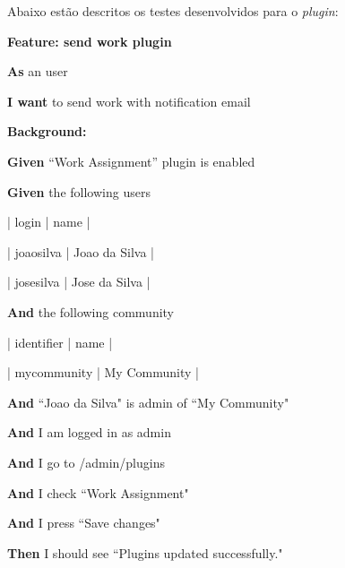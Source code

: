 Abaixo estão descritos os testes desenvolvidos para o \textit{plugin}:


\textbf{Feature: send work plugin}

\textbf{As} an user

\textbf{I want} to send work with notification email

\textbf{Background:}

\textbf{Given} ``Work Assignment'' plugin is enabled

\textbf{Given} the following users

      | login     | name          |

      | joaosilva | Joao da Silva |

      | josesilva | Jose da Silva |

\textbf{And} the following community

      | identifier  | name         |

      | mycommunity | My Community |

\textbf{And} ``Joao da Silva" is admin of ``My Community"

\textbf{And} I am logged in as admin

\textbf{And} I go to /admin/plugins

\textbf{And} I check ``Work Assignment"

\textbf{And} I press ``Save changes"

\textbf{Then} I should see ``Plugins updated successfully." 



